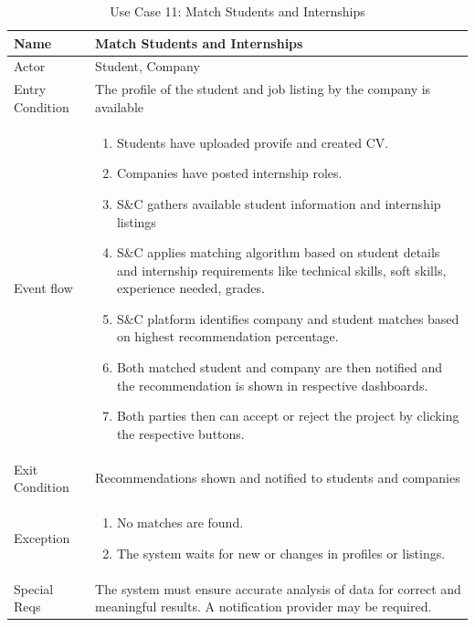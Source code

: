 \begin{table}[H]
    \centering
    \begin{tabular}{|l|p{12cm}|}
    \hline
    Name             & Match Students and Internships \\ \hline
    Actor            & Student, Company \\ \hline
    Entry Condition  & 
    The profile of the student and job listing by the company is available \\ \hline
    Event flow       & 
    \begin{enumerate}
        \item Students have uploaded provife and created CV.
        \item Companies have posted internship roles.
        \item S\&C gathers available student information and internship listings
        \item S\&C applies matching algorithm based on student details and internship requirements like technical skills, soft skills, experience needed, grades.
        \item S\&C platform identifies company and student matches based on highest recommendation percentage.
        \item Both matched student and company are then notified and the recommendation is shown in respective dashboards.
        \item Both parties then can accept or reject the project by clicking the respective buttons. 
    \end{enumerate} \\ \hline
    Exit Condition   & Recommendations shown and notified to students and companies \\ \hline
    Exception        & 
    \begin{enumerate}
        \item No matches are found.
    \item The system waits for new or changes in profiles or listings.
\end{enumerate} \\ \hline
Special Reqs     & The system must ensure accurate analysis of data for correct and meaningful results. A notification provider may be required. \\ \hline
\end{tabular}
\caption{Use Case 11: Match Students and Internships}
\label{tab:user_signup}
\end{table}


